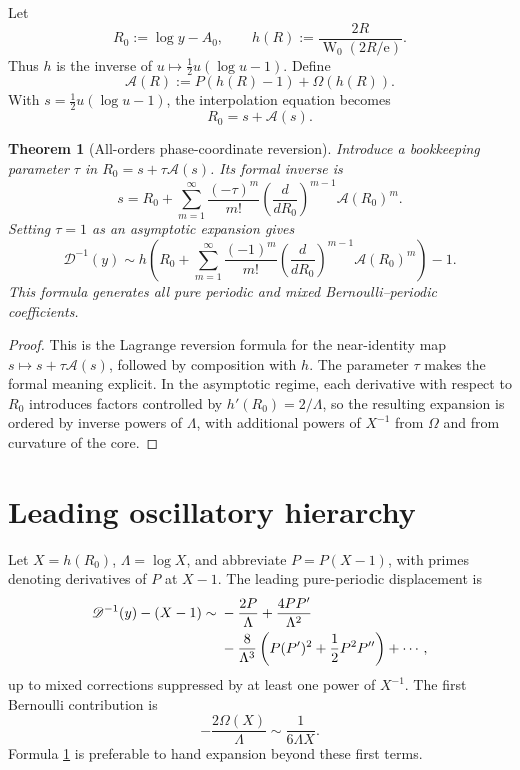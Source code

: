 \documentclass[11pt,a4paper,oneside]{book}
\newtheorem{theorem}{Theorem}[chapter]
\newcommand{\e}{\mathrm e}
\newcommand{\W}{\operatorname W}
\begin{document}
Let
\[
 R_0:=\log y-A_0,
 \qquad
 h(R):=\frac{2R}{\W_0(2R/\e)}.
\]
Thus \(h\) is the inverse of \(u\mapsto\tfrac12u(\log u-1)\).  Define
\begin{equation}\label{eq:phase-A}
 \mathcal A(R):=
 P(h(R)-1)+\Omega(h(R)).
\end{equation}
With \(s=\tfrac12u(\log u-1)\), the interpolation equation becomes
\[
 R_0=s+\mathcal A(s).
\]

\begin{theorem}[All-orders phase-coordinate reversion]
\label{thm:phase-reversion}
Introduce a bookkeeping parameter \(\tau\) in
\(R_0=s+\tau\mathcal A(s)\).  Its formal inverse is
\begin{equation}\label{eq:phase-s}
 s=
 R_0+\sum_{m=1}^\infty
 \frac{(-\tau)^m}{m!}
 \left(\frac{d}{dR_0}\right)^{m-1}
 \mathcal A(R_0)^m.
\end{equation}
Setting \(\tau=1\) as an asymptotic expansion gives
\begin{equation}\label{eq:interp-inverse-full}
 \boxed{
 \mathscr D^{-1}(y)
 \sim
 h\!\left(
 R_0+\sum_{m=1}^\infty
 \frac{(-1)^m}{m!}
 \left(\frac{d}{dR_0}\right)^{m-1}
 \mathcal A(R_0)^m
 \right)-1.}
\end{equation}
This formula generates all pure periodic and mixed Bernoulli--periodic
coefficients.
\end{theorem}

\begin{proof}
This is the Lagrange reversion formula for the near-identity map
\(s\mapsto s+\tau\mathcal A(s)\), followed by composition with \(h\).
The parameter \(\tau\) makes the formal meaning explicit.  In the asymptotic
regime, each derivative with respect to \(R_0\) introduces factors controlled
by \(h'(R_0)=2/\Lambda\), so the resulting expansion is ordered by inverse
powers of \(\Lambda\), with additional powers of \(X^{-1}\) from \(\Omega\)
and from curvature of the core.
\end{proof}

\section{Leading oscillatory hierarchy}

Let \(X=h(R_0)\), \(\Lambda=\log X\), and abbreviate
\(P=P(X-1)\), with primes denoting derivatives of \(P\) at \(X-1\).
The leading pure-periodic displacement is
\begin{align}
 \mathscr D^{-1}(y)-(X-1)
 \sim{}&
 -\frac{2P}{\Lambda}
 +\frac{4PP'}{\Lambda^2}
 \notag\\
 &-\frac{8}{\Lambda^3}
 \left(P(P')^2+\frac12P^2P''\right)
 +\cdots,
 \label{eq:periodic-hierarchy}
\end{align}
up to mixed corrections suppressed by at least one power of \(X^{-1}\).
The first Bernoulli contribution is
\[
 -\frac{2\Omega(X)}{\Lambda}
 \sim\frac{1}{6\Lambda X}.
\]
Formula \cref{thm:phase-reversion} is preferable to hand expansion beyond
these first terms.
\end{document}
